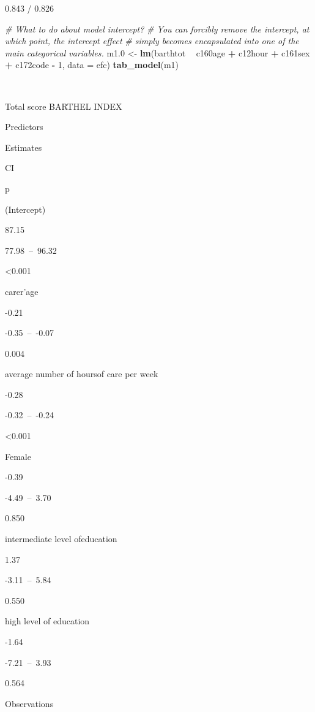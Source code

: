 \documentclass[]{article}
\newenvironment{Shaded}{\begin{snugshade}}{\end{snugshade}}
\newcommand{\KeywordTok}[1]{\textcolor[rgb]{0.13,0.29,0.53}{\textbf{#1}}}
\newcommand{\DataTypeTok}[1]{\textcolor[rgb]{0.13,0.29,0.53}{#1}}
\newcommand{\DecValTok}[1]{\textcolor[rgb]{0.00,0.00,0.81}{#1}}
\newcommand{\StringTok}[1]{\textcolor[rgb]{0.31,0.60,0.02}{#1}}
\newcommand{\CommentTok}[1]{\textcolor[rgb]{0.56,0.35,0.01}{\textit{#1}}}
\newcommand{\OperatorTok}[1]{\textcolor[rgb]{0.81,0.36,0.00}{\textbf{#1}}}
\newcommand{\NormalTok}[1]{#1}
\begin{document}
0.843 / 0.826

\begin{Shaded}
\begin{Highlighting}[]
\CommentTok{# What to do about model intercept?}
\CommentTok{# You can forcibly remove the intercept, at which point, the intercept effect}
\CommentTok{# simply becomes encapsulated into one of the main categorical variables.}
\NormalTok{m1.}\DecValTok{0}\NormalTok{ <-}\StringTok{ }\KeywordTok{lm}\NormalTok{(barthtot }\OperatorTok{~}\StringTok{ }\NormalTok{c160age }\OperatorTok{+}\StringTok{ }\NormalTok{c12hour }\OperatorTok{+}\StringTok{ }\NormalTok{c161sex }\OperatorTok{+}\StringTok{ }\NormalTok{c172code }\OperatorTok{-}\StringTok{ }\DecValTok{1}\NormalTok{, }\DataTypeTok{data =}\NormalTok{ efc)}
\KeywordTok{tab_model}\NormalTok{(m1)}
\end{Highlighting}
\end{Shaded}

~

Total score BARTHEL INDEX

Predictors

Estimates

CI

p

(Intercept)

87.15

77.98~--~96.32

\textless{}0.001

carer'age

-0.21

-0.35~--~-0.07

0.004

average number of hoursof care per week

-0.28

-0.32~--~-0.24

\textless{}0.001

Female

-0.39

-4.49~--~3.70

0.850

intermediate level ofeducation

1.37

-3.11~--~5.84

0.550

high level of education

-1.64

-7.21~--~3.93

0.564

Observations
\end{document}
